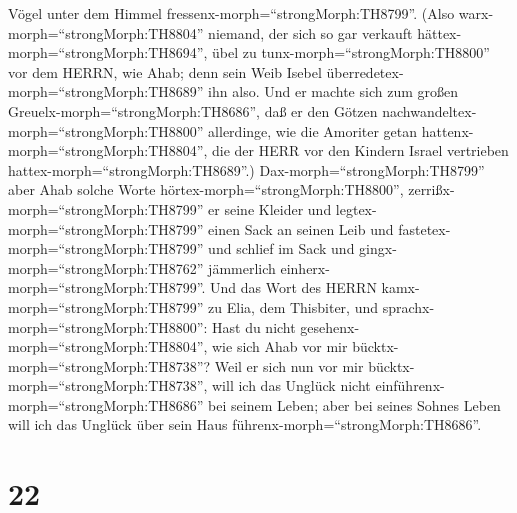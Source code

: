 Vögel unter dem Himmel fressenx-morph=``strongMorph:TH8799''.
 (Also warx-morph=``strongMorph:TH8804'' niemand, der sich
so gar verkauft hättex-morph=``strongMorph:TH8694'', übel zu
tunx-morph=``strongMorph:TH8800'' vor dem HERRN, wie Ahab; denn sein
Weib Isebel überredetex-morph=``strongMorph:TH8689'' ihn also.
 Und er machte sich zum großen
Greuelx-morph=``strongMorph:TH8686'', daß er den Götzen
nachwandeltex-morph=``strongMorph:TH8800'' allerdinge, wie die Amoriter
getan hattenx-morph=``strongMorph:TH8804'', die der HERR vor den Kindern
Israel vertrieben hattex-morph=``strongMorph:TH8689''.) 
Dax-morph=``strongMorph:TH8799'' aber Ahab solche Worte
hörtex-morph=``strongMorph:TH8800'',
zerrißx-morph=``strongMorph:TH8799'' er seine Kleider und
legtex-morph=``strongMorph:TH8799'' einen Sack an seinen Leib und
fastetex-morph=``strongMorph:TH8799'' und schlief im Sack und
gingx-morph=``strongMorph:TH8762'' jämmerlich
einherx-morph=``strongMorph:TH8799''.  Und das Wort des
HERRN kamx-morph=``strongMorph:TH8799'' zu Elia, dem Thisbiter, und
sprachx-morph=``strongMorph:TH8800'':  Hast du nicht
gesehenx-morph=``strongMorph:TH8804'', wie sich Ahab vor mir
bücktx-morph=``strongMorph:TH8738''? Weil er sich nun vor mir
bücktx-morph=``strongMorph:TH8738'', will ich das Unglück nicht
einführenx-morph=``strongMorph:TH8686'' bei seinem Leben; aber bei
seines Sohnes Leben will ich das Unglück über sein Haus
führenx-morph=``strongMorph:TH8686''.

\hypertarget{section-21}{%
\section{22}\label{section-21}}


